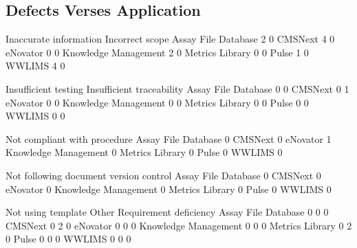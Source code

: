 \documentclass{article}
\begin{document}
\subsection{Defects Verses Application}

\begin{Schunk}
\begin{Soutput}
                       Inaccurate information Incorrect scope
  Assay File Database                       2               0
  CMSNext                                   4               0
  eNovator                                  0               0
  Knowledge Management                      2               0
  Metrics Library                           0               0
  Pulse                                     1               0
  WWLIMS                                    4               0
                      
                       Insufficient testing Insufficient traceability
  Assay File Database                     0                         0
  CMSNext                                 0                         1
  eNovator                                0                         0
  Knowledge Management                    0                         0
  Metrics Library                         0                         0
  Pulse                                   0                         0
  WWLIMS                                  0                         0
                      
                       Not compliant with procedure
  Assay File Database                             0
  CMSNext                                         0
  eNovator                                        1
  Knowledge Management                            0
  Metrics Library                                 0
  Pulse                                           0
  WWLIMS                                          0
                      
                       Not following document version control
  Assay File Database                                       0
  CMSNext                                                   0
  eNovator                                                  0
  Knowledge Management                                      0
  Metrics Library                                           0
  Pulse                                                     0
  WWLIMS                                                    0
                      
                       Not using template Other Requirement deficiency
  Assay File Database                   0     0                      0
  CMSNext                               0     2                      0
  eNovator                              0     0                      0
  Knowledge Management                  0     0                      0
  Metrics Library                       0     2                      0
  Pulse                                 0     0                      0
  WWLIMS                                0     0                      0
\end{Soutput}
\end{Schunk}
\end{document}
